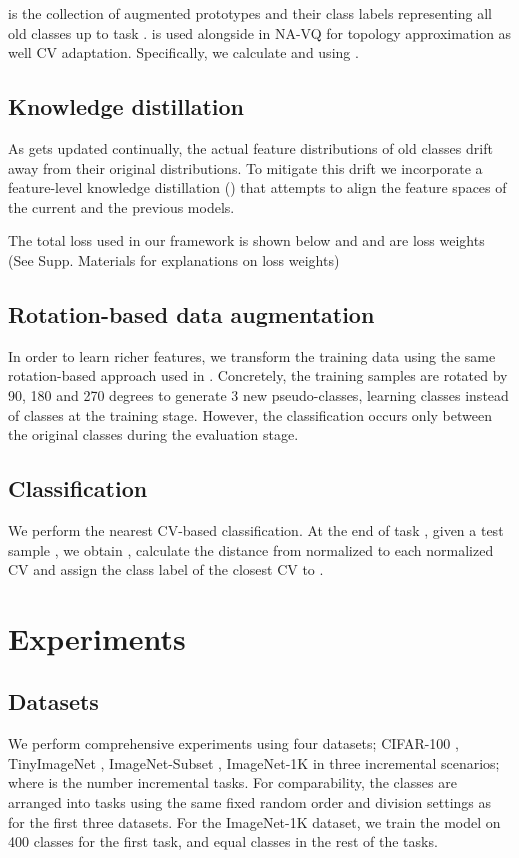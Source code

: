 \documentclass[10pt,twocolumn,letterpaper]{article}
\begin{document}
 is the collection of augmented prototypes and their class labels representing all old classes up to task . 
 is used alongside  in NA-VQ for topology approximation as well CV adaptation. Specifically, we calculate  and  using . 


\subsection{Knowledge distillation}
As  gets updated continually, the actual feature distributions of old classes drift away from their original distributions. To mitigate this drift we incorporate a feature-level knowledge distillation () \cite{Zhu2021PrototypeLearning, Zhu2021Class-IncrementalAugmentation} that attempts to align the feature spaces of the current and  the previous models.
 
The total loss used in our framework is shown below and  and  are loss weights (See Supp. Materials for explanations on loss weights)



\subsection{Rotation-based data augmentation}
In order to learn richer features, we transform the training data using the same rotation-based approach used in \cite{Zhu2021PrototypeLearning}. Concretely, the training samples are rotated by 90, 180 and 270 degrees to generate 3 new pseudo-classes, learning  classes instead of  classes at the training stage. However, the classification occurs only between the original classes during the evaluation stage.

\subsection{Classification}
We perform the nearest CV-based classification. At the end of task , given a test sample , we obtain , calculate the distance from normalized  to each normalized CV and assign the class label of the closest CV to . 


\section{Experiments}

\subsection{Datasets}
We perform comprehensive experiments using four datasets; CIFAR-100 \cite{Krizhevsky2009LearningImages}, TinyImageNet \cite{Le2015TinyChallenge}, ImageNet-Subset \cite{Deng2009Imagenet:Database}, ImageNet-1K \cite{Deng2009Imagenet:Database} in three incremental scenarios;  where  is the number incremental tasks. For comparability, the classes are arranged into tasks using the same fixed random order and division settings as \cite{Zhu2021PrototypeLearning, Zhu2022Self-SustainingLearning} for the first three datasets. For the ImageNet-1K dataset, we train the model on 400 classes for the first task, and equal classes in the rest of the tasks. 
\end{document}
